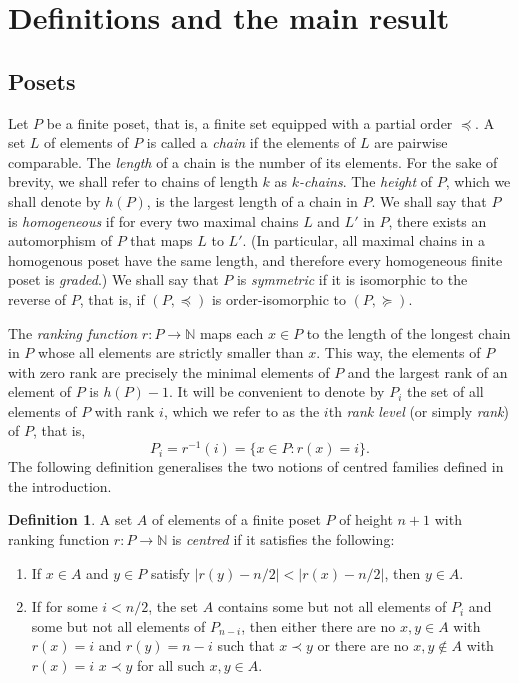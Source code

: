 \documentclass[11pt,a4paper,reqno]{amsart}
\numberwithin{claim}{thm}
\theoremstyle{definition}
\newtheorem{dfn}[thm]{Definition}
\newcommand{\Nat}{\mathbb{N}}
\newcommand{\pl}{\preceq}
\newcommand{\pg}{\succeq}
\begin{document}
\section{Definitions and the main result}
\label{sec:defin-prel}

\subsection{Posets}

Let $P$ be a finite poset, that is, a finite set equipped with a partial order $\pl$. A set $L$ of elements of $P$ is called a \emph{chain} if the elements of $L$ are pairwise comparable. The \emph{length} of a chain is the number of its elements. For the sake of brevity, we shall refer to chains of length $k$ as \emph{$k$-chains}. The \emph{height} of $P$, which we shall denote by $h(P)$, is the largest length of a chain in $P$. We shall say that $P$ is \emph{homogeneous} if for every two maximal chains $L$ and $L'$ in $P$, there exists an automorphism of $P$ that maps $L$ to $L'$. (In particular, all maximal chains in a homogenous poset have the same length, and therefore every homogeneous finite poset is \emph{graded}.) We shall say that $P$ is \emph{symmetric} if it is isomorphic to the reverse of $P$, that is, if $(P, \pl)$ is order-isomorphic to $(P, \pg)$.

The \emph{ranking function} $r \colon P \to \Nat$ maps each $x \in P$ to the length of the longest chain in $P$ whose all elements are strictly smaller than $x$. This way, the elements of $P$ with zero rank are precisely the minimal elements of $P$ and the largest rank of an element of $P$ is $h(P) - 1$. It will be convenient to denote by $P_i$ the set of all elements of $P$ with rank $i$, which we refer to as the $i$th \emph{rank level} (or simply \emph{rank}) of $P$, that is,
\[
  P_i = r^{-1}(i) = \{x \in P \colon r(x) = i\}.
\]
The following definition generalises the two notions of centred families defined in the introduction.

\begin{dfn}
  \label{dfn:centred}
  A set $A$ of elements of a finite poset $P$ of height $n+1$ with ranking function $r \colon P \to \Nat$ is \emph{centred} if it satisfies the following:
  \begin{enumerate}[label={(\roman*)}]
  \item
    \label{item:centred-1}
    If $x \in A$ and $y \in P$ satisfy $|r(y)  - n/2| < |r(x) - n/2|$, then $y \in A$.
  \item
    \label{item:centred-2}
    If for some $i < n/2$, the set $A$ contains some but not all elements of $P_i$ and some but not all elements of $P_{n-i}$, then either there are no $x, y \in A$ with $r(x) = i$ and $r(y) = n-i$ such that $x \prec y$ or there are no $x, y \not\in A$ with $r(x) = i$ $x \prec y$ for all such $x, y \in A$.
  \end{enumerate}
\end{dfn}
\end{document}

